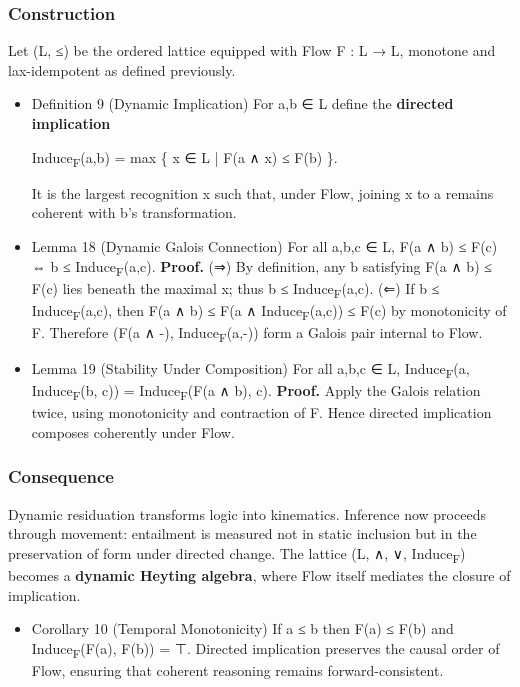 \documentclass[11pt]{article}
\begin{document}
\subsubsection*{Construction}
\label{sec:org9833ecd}
Let (L, ≤) be the ordered lattice equipped with Flow F : L → L,  
monotone and lax-idempotent as defined previously.
\begin{itemize}
\item Definition 9 (Dynamic Implication)
\label{sec:org6cafdd2}
For a,b ∈ L define the \textbf{directed implication}

Induce\textsubscript{F}(a,b) = max \{ x ∈ L | F(a ∧ x) ≤ F(b) \}.

It is the largest recognition x such that, under Flow,  
joining x to a remains coherent with b’s transformation.
\item Lemma 18 (Dynamic Galois Connection)
\label{sec:orgf9abcae}
For all a,b,c ∈ L,
F(a ∧ b) ≤ F(c)  ⇔  b ≤ Induce\textsubscript{F}(a,c).
\textbf{Proof.}  
(⇒) By definition, any b satisfying F(a ∧ b) ≤ F(c) lies beneath the maximal x;  
thus b ≤ Induce\textsubscript{F}(a,c).  
(⇐) If b ≤ Induce\textsubscript{F}(a,c), then F(a ∧ b) ≤ F(a ∧ Induce\textsubscript{F}(a,c)) ≤ F(c) by monotonicity of F.  
Therefore (F(a ∧ -), Induce\textsubscript{F}(a,-)) form a Galois pair internal to Flow.
\item Lemma 19 (Stability Under Composition)
\label{sec:orgb0e0f9c}
For all a,b,c ∈ L,  
Induce\textsubscript{F}(a, Induce\textsubscript{F}(b, c)) = Induce\textsubscript{F}(F(a ∧ b), c).
\textbf{Proof.}  
Apply the Galois relation twice, using monotonicity and contraction of F.  
Hence directed implication composes coherently under Flow.
\end{itemize}
\subsubsection*{Consequence}
\label{sec:orgfc3a814}
Dynamic residuation transforms logic into kinematics.  
Inference now proceeds through movement:  
entailment is measured not in static inclusion but in the preservation of form under directed change.  
The lattice (L, ∧, ∨, Induce\textsubscript{F})  
becomes a \textbf{dynamic Heyting algebra},  
where Flow itself mediates the closure of implication.
\begin{itemize}
\item Corollary 10 (Temporal Monotonicity)
\label{sec:orgdbfa97e}
If a ≤ b then F(a) ≤ F(b) and Induce\textsubscript{F}(F(a), F(b)) = ⊤.  
Directed implication preserves the causal order of Flow,  
ensuring that coherent reasoning remains forward-consistent.
\end{itemize}
\end{document}

